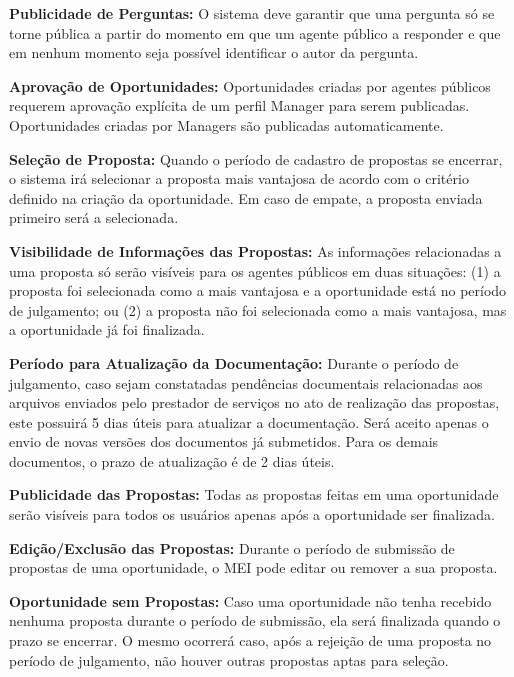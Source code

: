 \begin{description}[noitemsep, topsep=0pt, parsep=0.6pt, leftmargin=1.8cm, labelwidth=1.5cm]
    \item[\label{rn:19}RN19 -] \textbf{Publicidade de Perguntas:} O sistema deve garantir que uma pergunta só se torne pública a partir do momento em que um agente público a responder e que em nenhum momento seja possível identificar o autor da pergunta. 

    \item[\label{rn:20}RN20 -] \textbf{Aprovação de Oportunidades:} Oportunidades criadas por agentes públicos requerem aprovação explícita de um perfil Manager para serem publicadas. Oportunidades criadas por Managers são publicadas automaticamente. 

    \item[\label{rn:21}RN21 -] \textbf{Seleção de Proposta:} Quando o período de cadastro de propostas se encerrar, o sistema irá selecionar a proposta mais vantajosa de acordo com o critério definido na criação da oportunidade. Em caso de empate, a proposta enviada primeiro será a selecionada. 

    \item[\label{rn:22}RN22 -] \textbf{Visibilidade de Informações das Propostas:} As informações relacionadas a uma proposta só serão visíveis para os agentes públicos em duas situações: (1) a proposta foi selecionada como a mais vantajosa e a oportunidade está no período de julgamento; ou (2) a proposta não foi selecionada como a mais vantajosa, mas a oportunidade já foi finalizada. 

    \item[\label{rn:23}RN23 -] \textbf{Período para Atualização da Documentação:} Durante o período de julgamento, caso sejam constatadas pendências documentais relacionadas aos arquivos enviados pelo prestador de serviços no ato de realização das propostas, este possuirá 5 dias úteis para atualizar a documentação. Será aceito apenas o envio de novas versões dos documentos já submetidos. Para os demais documentos, o prazo de atualização é de 2 dias úteis. 

    \item[\label{rn:24}RN24 -] \textbf{Publicidade das Propostas:} Todas as propostas feitas em uma oportunidade serão visíveis para todos os usuários apenas após a oportunidade ser finalizada. 

    \item[\label{rn:25}RN25 -] \textbf{Edição/Exclusão das Propostas:} Durante o período de submissão de propostas de uma oportunidade, o MEI pode editar ou remover a sua proposta. 

    \item[\label{rn:26}RN26 -] \textbf{Oportunidade sem Propostas:} Caso uma oportunidade não tenha recebido nenhuma proposta durante o período de submissão, ela será finalizada quando o prazo se encerrar. O mesmo ocorrerá caso, após a rejeição de uma proposta no período de julgamento, não houver outras propostas aptas para seleção. 
\end{description}



